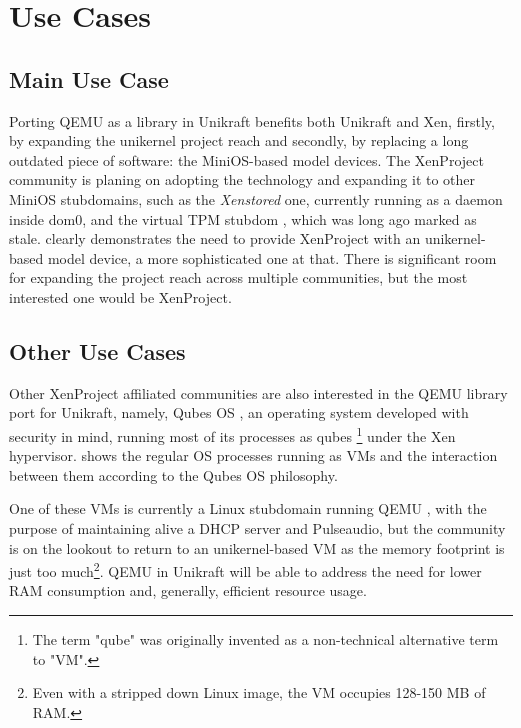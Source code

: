 \chapter{Use Cases}
\label{chapter:use-cases}

\section{Main Use Case}
\label{sec:main-use-case}

Porting QEMU as a library in Unikraft benefits both Unikraft and Xen, firstly, by expanding the unikernel project reach and secondly, by replacing a long outdated piece of software: the MiniOS-based model devices.
The XenProject community is planing on adopting the technology and expanding it to other MiniOS stubdomains, such as the \textit{Xenstored} \cite{xenstored-stubdom} one, currently running as a daemon inside dom0, and the virtual TPM stubdom \cite{xen-tpm-stubdom}, which was long ago marked as stale.
 clearly demonstrates the need to provide XenProject with an unikernel-based model device, a more sophisticated one at that.
There is significant room for expanding the project reach across multiple communities, but the most interested one would be XenProject.


\section{Other Use Cases}
\label{sec:other-use-cases}

Other XenProject affiliated communities are also interested in the QEMU library port for Unikraft, namely, Qubes OS \cite{qubes-os}, an operating system developed with security in mind, running most of its processes as qubes \footnote{The term "qube" was originally invented as a non-technical alternative term to "VM".} under the Xen hypervisor.
 shows the regular OS processes running as VMs and the interaction between them according to the Qubes OS philosophy.


One of these VMs is currently a Linux stubdomain running QEMU \cite{qubes-os-linux-stubdom}, with the purpose of maintaining alive a DHCP server and Pulseaudio, but the community is on the lookout to return to an unikernel-based VM as the memory footprint is just too much\footnote{Even with a stripped down Linux image, the VM occupies 128-150 MB of RAM.}.
QEMU in Unikraft will be able to address the need for lower RAM consumption and, generally, efficient resource usage.

